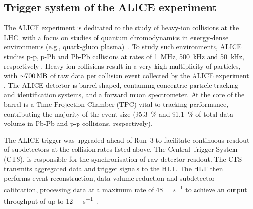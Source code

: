 \subsection{Trigger system of the ALICE experiment}
The ALICE experiment is dedicated to the study of heavy-ion collisions at the LHC, with a focus on studies of quantum chromodynamics in energy-dense environments (e.g.,  quark-gluon plasma)~\cite{alice-performance-paper-run1}. To study such environments, ALICE studies p-p, p-Pb and Pb-Pb collisions at rates of \SI{1}{\mega\hertz}, \SI{500}{\kilo\hertz} and \SI{50}{\kilo\hertz}, respectively \cite{alice-trigger-run3}. Heavy ion collisions result in a very high multiplicity of particles, with ${\sim}\SI{700}{\mega\byte}$ of raw data per collision event collected by the ALICE experiment \cite{alice-rta-trigger}. The ALICE detector is barrel-shaped, containing concentric particle tracking and identification systems, and a forward muon spectrometer. At the core of the barrel is a Time Projection Chamber (TPC) vital to tracking performance, contributing the majority of the event size (\SI{95.3}{\percent} and \SI{91.1}{\percent} of total data volume in Pb-Pb and p-p collisions, respectively).

The ALICE trigger was upgraded ahead of Run~3 to facilitate continuous readout of subdetectors at the collision rates listed above. The Central Trigger System (CTS), is responsible for the synchronisation of raw detector readout. The CTS transmits aggregated data and trigger signals to the HLT. The HLT then performs event reconstruction, data volume reduction and subdetector calibration, processing data at a maximum rate of \SI{48}{\giga\byte\per\second} to achieve an output throughput of up to \SI{12}{\giga\byte\per\second}~\cite{alice-rta-trigger}.
